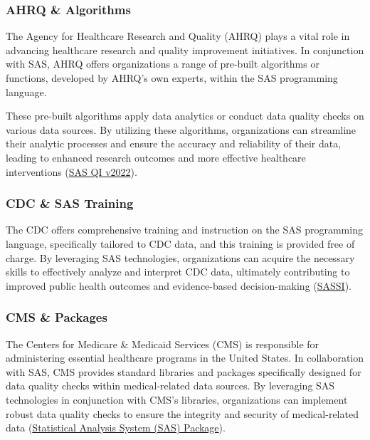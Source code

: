 \subsubsection{AHRQ \& Algorithms}
The Agency for Healthcare Research and Quality (AHRQ) plays a vital role in advancing healthcare research and quality improvement initiatives. In conjunction with SAS, AHRQ offers organizations a range of pre-built algorithms or functions, developed by AHRQ's own experts, within the SAS programming language. 

These pre-built algorithms apply data analytics or conduct data quality checks on various data sources. By utilizing these algorithms, organizations can streamline their analytic processes and ensure the accuracy and reliability of their data, leading to enhanced research outcomes and more effective healthcare interventions (\href{https://qualityindicators.ahrq.gov/software/sas_qi}{SAS QI v2022}).

\subsubsection{CDC \& SAS Training}
The CDC offers comprehensive training and instruction on the SAS programming language, specifically tailored to CDC data, and this training is provided free of charge. By leveraging SAS technologies, organizations can acquire the necessary skills to effectively analyze and interpret CDC data, ultimately contributing to improved public health outcomes and evidence-based decision-making (\href{https://www.cdc.gov/std/sassi/default.htm}{SASSI}).

\subsubsection{CMS \& Packages}
The Centers for Medicare \& Medicaid Services (CMS) is responsible for administering essential healthcare programs in the United States. In collaboration with SAS, CMS provides standard libraries and packages specifically designed for data quality checks within medical-related data sources. By leveraging SAS technologies in conjunction with CMS's libraries, organizations can implement robust data quality checks to ensure the integrity and security of medical-related data (\href{https://qualitynet.cms.gov/outpatient/public-reporting/overall-ratings/sas}{Statistical Analysis System (SAS) Package}).